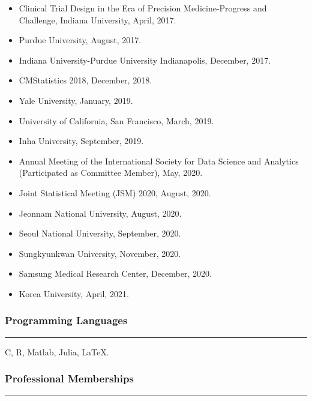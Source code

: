 \documentclass[
]{book}
\begin{document}
\begin{itemize}
\item
  Clinical Trial Design in the Era of Precision Medicine-Progress and Challenge, Indiana University, April, 2017.
\item
  Purdue University, August, 2017.
\item
  Indiana University-Purdue University Indianapolis, December, 2017.
\item
  CMStatistics 2018, December, 2018.
\item
  Yale University, January, 2019.
\item
  University of California, San Francisco, March, 2019.
\item
  Inha University, September, 2019.
\item
  Annual Meeting of the International Society for Data Science and Analytics (Participated as Committee Member), May, 2020.
\item
  Joint Statistical Meeting (JSM) 2020, August, 2020.
\item
  Jeonnam National University, August, 2020.
\item
  Seoul National University, September, 2020.
\item
  Sungkyunkwan University, November, 2020.
\item
  Samsung Medical Research Center, December, 2020.
\item
  Korea University, April, 2021.
\end{itemize}

\hypertarget{programming-languages}{%
\subsubsection*{Programming Languages}\label{programming-languages}}

\begin{center}\rule{0.5\linewidth}{0.5pt}\end{center}

C, R, Matlab, Julia, LaTeX.

\hypertarget{professional-memberships}{%
\subsubsection*{Professional Memberships}\label{professional-memberships}}

\begin{center}\rule{0.5\linewidth}{0.5pt}\end{center}
\end{document}
